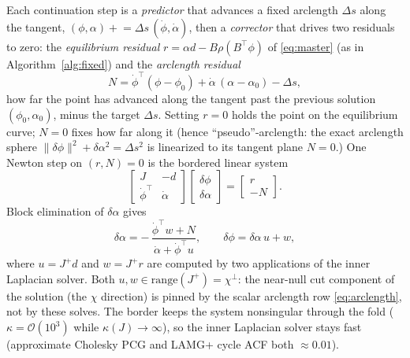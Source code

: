 \documentclass{siamart220329}
\begin{document}
Each continuation step is a \emph{predictor} that advances a fixed arclength $\Delta s$ along the
tangent, $(\phi,\alpha)\mathrel{+}=\Delta s\,(\dot\phi,\dot\alpha)$, then a \emph{corrector} that
drives two residuals to zero: the \emph{equilibrium residual} $r=\alpha d-B\rho(B^{\top}\phi)$ of
\eqref{eq:master} (as in Algorithm~\ref{alg:fixed}) and the \emph{arclength residual}
\begin{equation}\label{eq:arclength}
N=\dot\phi^{\top}(\phi-\phi_0)+\dot\alpha\,(\alpha-\alpha_0)-\Delta s ,
\end{equation}
how far the point has advanced along the tangent past the previous solution $(\phi_0,\alpha_0)$, minus
the target $\Delta s$. Setting $r=0$ holds the point on the equilibrium curve; $N=0$ fixes how far
along it (hence
``pseudo''-arclength: the exact arclength sphere $\|\delta\phi\|^2+\delta\alpha^2=\Delta s^2$
is linearized to its tangent plane $N=0$.) One Newton step on $(r,N)=0$ is the bordered linear system
\begin{equation}\label{eq:bordered}
\begin{bmatrix} J & -d\\ \dot\phi^{\top} & \dot\alpha\end{bmatrix}
\begin{bmatrix}\delta\phi\\ \delta\alpha\end{bmatrix}=\begin{bmatrix}r\\ -N\end{bmatrix}.
\end{equation}
Block elimination of $\delta\alpha$ gives
\begin{equation}\label{eq:deflate}
\delta\alpha=-\,\frac{\dot\phi^{\top}w+N}{\dot\alpha+\dot\phi^{\top}u},\qquad
\delta\phi=\delta\alpha\,u+w ,
\end{equation}
where $u=J^{+}d$ and $w=J^{+}r$ are computed by two applications of the inner Laplacian solver.
Both $u,w\in\mathrm{range}(J^{+})=\chi^{\perp}$: the near-null cut component of the solution (the
$\chi$ direction) is pinned by the scalar arclength row \eqref{eq:arclength}, not by these solves. The
border keeps the system nonsingular through the fold ($\kappa=\mathcal{O}(10^3)$ while
$\kappa(J)\to\infty$), so the inner Laplacian solver stays fast (approximate Cholesky PCG and LAMG+ cycle ACF both $\approx0.01$).
\end{document}
